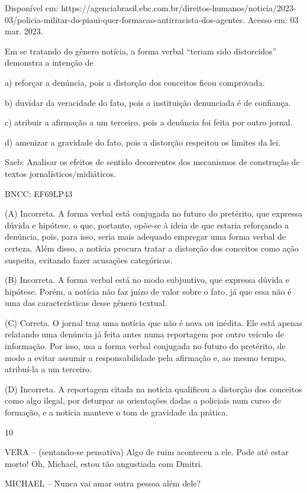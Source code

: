 Disponível em:
https://agenciabrasil.ebc.com.br/direitos-humanos/noticia/2023-03/policia-militar-do-piaui-quer-formacao-antirracista-dos-agentes.
Acesso em: 03 mar. 2023.

Em se tratando do gênero notícia, a forma verbal ``teriam sido
distorcidos'' demonstra a intenção de

a) reforçar a denúncia, pois a distorção dos conceitos ficou comprovada.

b) duvidar da veracidade do fato, pois a instituição denunciada é de
confiança.

c) atribuir a afirmação a um terceiro, pois a denúncia foi feita por
outro jornal.

d) amenizar a gravidade do fato, pois a distorção respeitou os limites
da lei.

Saeb: Analisar os efeitos de sentido decorrentes dos mecanismos de
construção de textos jornalísticos/midiáticos.

BNCC: EF69LP43

(A) Incorreta. A forma verbal está conjugada no futuro do pretérito, que
expressa dúvida e hipótese, o que, portanto, opõe-se à ideia de que
estaria reforçando a denúncia, pois, para isso, seria mais adequado
empregar uma forma verbal de certeza. Além disso, a notícia procura
tratar a distorção dos conceitos como ação suspeita, evitando fazer
acusações categóricas.

(B) Incorreta. A forma verbal está no modo subjuntivo, que expressa
dúvida e hipótese. Porém, a notícia não faz juízo de valor sobre o fato,
já que essa não é uma das características desse gênero textual.

(C) Correta. O jornal traz uma notícia que não é nova ou inédita. Ele
está apenas relatando uma denúncia já feita antes numa reportagem por
outro veículo de informação. Por isso, usa a forma verbal conjugada no
futuro do pretérito, de modo a evitar assumir a responsabilidade pela
afirmação e, ao mesmo tempo, atribuí-la a um terceiro.

(D) Incorreta. A reportagem citada na notícia qualificou a distorção dos
conceitos como algo ilegal, por deturpar as orientações dadas a
policiais num curso de formação, e a notícia manteve o tom de gravidade
da prática.

\num{10}

VERA -- (sentando-se pensativa) Algo de ruim aconteceu a ele. Pode até
estar morto! Oh, Michael, estou tão angustiada com Dmitri.

MICHAEL -- Nunca vai amar outra pessoa além dele?

